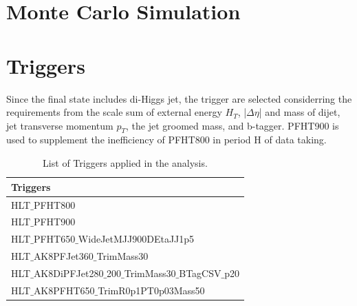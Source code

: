 \section{Monte Carlo Simulation} \label{Monte Carlo Simulation}	

\section{Triggers} \label{Triggers}
Since the final state includes di-Higgs jet, the trigger are selected considerring the requirements from the scale sum of external energy $H_T$, |$\Delta \eta $| and mass of dijet, jet transverse momentum $p_T$, the jet groomed mass, and b-tagger. PFHT900 is used to supplement the inefficiency of PFHT800 in period H of data taking.
\begin{table}[h!]
  \begin{center}
    \begin{tabular}{l}
    Triggers \\
    \hline
    HLT$\_$PFHT800 \\
    HLT$\_$PFHT900 \\
    HLT$\_$PFHT650$\_$WideJetMJJ900DEtaJJ1p5 \\
    HLT$\_$AK8PFJet360$\_$TrimMass30 \\
    HLT$\_$AK8DiPFJet280$\_$200$\_$TrimMass30$\_$BTagCSV$\_$p20 \\
    HLT$\_$AK8PFHT650$\_$TrimR0p1PT0p03Mass50 \\
    \hline
    \end{tabular}
  \end{center}

  \caption{List of Triggers applied in the analysis.}
\end{table} 


